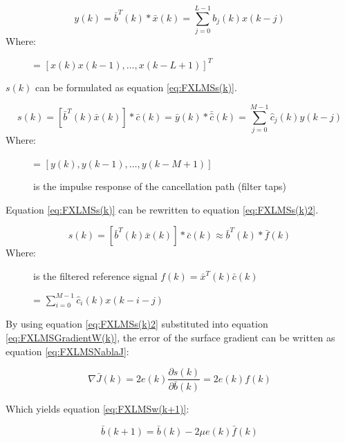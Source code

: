 \begin{equation}\label{eq:FXLMSOutput}
y(k) = \bar{b}^T(k)*\bar{x}(k) = \sum_{j=0}^{L-1} b_j(k)x(k-j)
\end{equation}
Where:
\begin{description}
	\item[] = $[x(k) x(k-1),\dotsc, x(k-L+1)]^T $
\end{description}
$s(k)$ can be formulated as equation \ref{eq:FXLMSs(k)}.

\begin{equation}\label{eq:FXLMSs(k)}
s(k) = [\bar{b}^T(k)\bar{x}(k)]*\bar{c}(k) = \bar{y}(k)*\bar{\hat{c}}(k) = \sum_{j=0}^{M-1}\hat{c}_j(k)y(k-j)
\end{equation}
Where:
\begin{description}
	\item[] = $[ y(k), y(k-1), \dotsc, y(k-M+1)]$
	\item[] is the impulse response of the cancellation path (filter taps)
\end{description}

Equation \ref{eq:FXLMSs(k)} can be rewritten to equation \ref{eq:FXLMSs(k)2}.

\begin{equation}\label{eq:FXLMSs(k)2}
s(k) = [\bar{b}^T(k)\bar{x}(k)]*\bar{c}(k)\approx \bar{b}^T(k)*\bar{f}(k)
\end{equation}
Where:
\begin{description}
	\item[] is the filtered reference signal $f(k)=\bar{x}^T(k)\bar{c}(k)$
	\item[] = $\sum_{i=0}^{M-1}\hat{c}_i(k)x(k-i-j)$
\end{description}

By using equation \ref{eq:FXLMSs(k)2} substituted into equation \ref{eq:FXLMSGradientW(k)}, the error of the surface gradient can be written as equation \ref{eq:FXLMSNablaJ}:

\begin{equation}\label{eq:FXLMSNablaJ}
\nabla \bar{J}(k) = 2e(k)\frac{\partial s(k)}{\partial \bar{b}(k)} = 2e(k)f(k)
\end{equation}

Which yields equation \ref{eq:FXLMSw(k+1)}:

\begin{equation}\label{eq:FXLMSw(k+1)}
\bar{b}(k+1) = \bar{b}(k) - 2\mu e(k)\bar{f}(k)
\end{equation}


